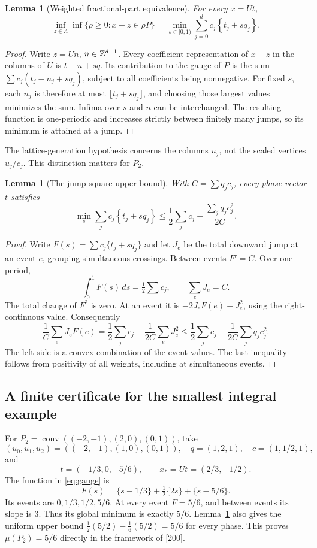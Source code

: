 \documentclass[11pt,a4paper]{article}
\newtheorem{lemma}[theorem]{Lemma}
\theoremstyle{remark}
\DeclareMathOperator{\conv}{conv}
\newcommand{\fr}[1]{\left\{#1\right\}}
\begin{document}
\begin{lemma}[Weighted fractional-part equivalence]\label{lem:gauge}
For every $x=Ut$,
\begin{equation}\label{eq:gauge}
 \inf_{z\in\Lambda}\inf\{\rho\ge0:x-z\in\rho P\}
 =\min_{s\in[0,1)}\sum_{j=0}^d c_j\fr{t_j+sq_j}.
\end{equation}
\end{lemma}
\begin{proof}
Write $z=Un$, $n\in\mathbb Z^{d+1}$. Every coefficient representation of
$x-z$ in the columns of $U$ is $t-n+sq$. Its contribution to the
gauge of $P$ is the sum $\sum c_j(t_j-n_j+sq_j)$, subject to all
coefficients being nonnegative. For fixed $s$, each $n_j$ is therefore
at most $\lfloor t_j+sq_j\rfloor$, and choosing those largest values
minimizes the sum. Infima over $s$ and $n$ can be interchanged.
The resulting function is one-periodic and increases strictly
between finitely many jumps, so its minimum is attained at a jump.
\end{proof}

The lattice-generation hypothesis concerns the columns $u_j$, not
the scaled vertices $u_j/c_j$. This distinction matters for $P_2$.

\begin{lemma}[The jump-square upper bound]\label{lem:jump}
With $C=\sum q_jc_j$, every phase vector $t$ satisfies
\[
 \min_s\sum_jc_j\fr{t_j+sq_j}
 \le\frac12\sum_jc_j-\frac{\sum_jq_jc_j^2}{2C}.
\]
\end{lemma}
\begin{proof}
Write $F(s)=\sum c_j\{t_j+sq_j\}$ and let $J_e$ be the total
downward jump at an event $e$, grouping simultaneous crossings.
Between events $F'=C$. Over one period,
\[
 \int_0^1F(s)\,ds=\tfrac12\sum c_j,\qquad
 \sum_eJ_e=C.
\]
The total change of $F^2$ is zero. At an event it is
$-2J_eF(e)-J_e^2$, using the right-continuous value. Consequently
\[
 \frac1C\sum_eJ_eF(e)
 =\frac12\sum_jc_j-\frac1{2C}\sum_eJ_e^2
 \le\frac12\sum_jc_j-\frac1{2C}\sum_jq_jc_j^2.
\]
The left side is a convex combination of the event values.
The last inequality follows from positivity of all weights,
including at simultaneous events.
\end{proof}

\subsection{A finite certificate for the smallest integral example}
For $P_2=\conv((-2,-1),(2,0),(0,1))$, take
\[
 (u_0,u_1,u_2)=((-2,-1),(1,0),(0,1)),\quad
 q=(1,2,1),\quad c=(1,1/2,1),
\]
and
\[
 t=(-1/3,0,-5/6),\qquad x_*=Ut=(2/3,-1/2).
\]
The function in \eqref{eq:gauge} is
\begin{equation}\label{eq:F}
 F(s)=\{s-1/3\}+\tfrac12\{2s\}+\{s-5/6\}.
\end{equation}
Its events are $0,1/3,1/2,5/6$. At every event $F=5/6$, and between
events its slope is $3$. Thus its global minimum is exactly $5/6$.
Lemma~\ref{lem:jump} also gives the uniform upper bound
$\tfrac12(5/2)-\tfrac1{6}(5/2)=5/6$ for every phase.
This proves $\mu(P_2)=5/6$ directly in the framework of [200].
\end{document}
